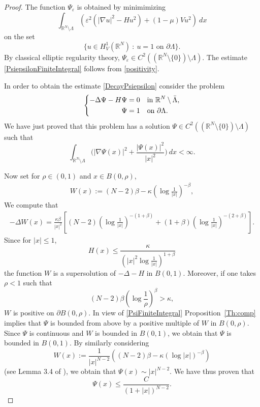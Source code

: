 \documentclass[a4paper]{amsart}
\begin{document}
\begin{proof}
The function $\Psi_\varepsilon$ is obtained by minimimizing 
\[
 \int_{{\mathbb{R}}^N\setminus \Lambda} \left( \varepsilon^2 \left( {\left| {\nabla u} \right|}^2 - H u^2 \right) + (1-\mu) V u^2 \right)\: dx
\]
on the set
\[
 \{ u \in H^1_V({\mathbb{R}}^N)\: :\: u=1 \text{ on } \partial \Lambda\}.
\]
By classical elliptic regularity theory, $\Psi_\varepsilon \in C^2\left(({\mathbb{R}}^N\setminus \lbrace 0 \rbrace) \setminus \Lambda
\right)$.
The estimate \eqref{PsiepsilonFiniteIntegral} follows from \eqref{positivity}.

In order to obtain the estimate \eqref{DecayPsiepsilon} consider the problem
\[
 \left\{ \begin{aligned}
          -\Delta \Psi - H \Psi &= 0 & &\text{in}\ {\mathbb{R}}^N\setminus \Bar{\Lambda}, \\
	\Psi &= 1 & &\textnormal{on}\ \partial \Lambda.
         \end{aligned}
 \right.
\]
We have just proved that this problem has a solution $\Psi \in C^2(({\mathbb{R}}^N \setminus \{0\})\setminus \Lambda)$ such that
\begin{equation}
\label{PsiFiniteIntegral}
 \int_{{\mathbb{R}}^N\setminus \Lambda} \biggl( {\left| {\nabla \Psi(x)} \right|}^2 + \frac{{\left| {\Psi(x)} \right|}^2}{{\left| {x} \right|}^2} \biggr)\: dx <
\infty.
\end{equation}

Now set for $\rho \in (0,1)$ and $x \in B(0, \rho)$,
\begin{align*}
 W(x) := (N-2)\beta - \kappa \left( \log\frac{1}{{\left| {x} \right|}} \right)^{-\beta},
\end{align*}
We compute that
\begin{align*}
 -\Delta W(x) = \frac{\kappa \beta}{{\left| {x} \right|}^2} \left[ (N-2) \left( \log\frac{1}{{\left| {x} \right|}}\right)^{-(1+\beta)} + (1+\beta)
\left( \log\frac{1}{{\left| {x} \right|}}\right)^{-(2+\beta)} \right].
\end{align*}
Since for ${\left| {x} \right|} \leq 1$,
\[
H(x)\leq \frac{\kappa}{({\left| {x} \right|}^2 \log \frac{1}{{\left| {x} \right|}})^{1+\beta}}
\]
the function $W$ is a supersolution of $-\Delta - H$ in $B(0,1)$. 
Moreover, if one takes $\rho < 1$ such that 
\[
  (N-2)\beta \left( \log\frac{1}{\rho} \right)^{\beta} > \kappa,
\]
$W$ is positive on $\partial B(0,\rho)$. 
In view of \eqref{PsiFiniteIntegral} Proposition~\ref{Th:comp} implies that $\Psi$ is bounded from above by
a positive multiple of $W$ in $B(0,\rho)$. Since $\Psi$ is continuous and $W$ is bounded in $B(0,1)$, we obtain that
$\Psi$ is bounded in $B(0, 1)$.
By similarly considering
\[
 W(x) := \frac{1}{{\left| {x} \right|}^{N-2}} \left((N-2)\beta - \kappa \left( \log{\left| {x} \right|} \right)^{-\beta}\right)
\]
(see Lemma 3.4 of \cite{MVS}), we obtain that $\Psi(x)\sim{\left| {x} \right|}^{N-2}$. We have thus proven that
\[
 \Psi(x)\leq \frac{C}{(1+{\left| {x} \right|})^{N-2}}.
\]


\end{proof}
\end{document}
